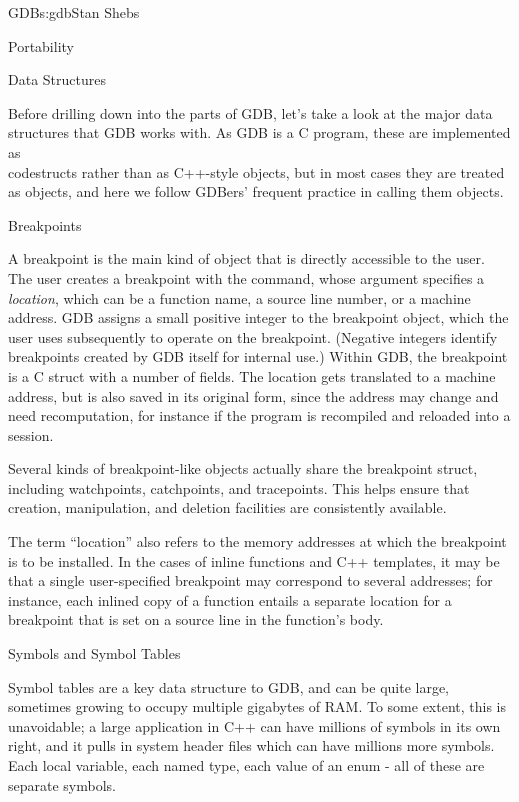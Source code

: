 \begin{aosachapter}{GDB}{s:gdb}{Stan Shebs}
\begin{aosasect1}{Portability}
\end{aosasect1}

\begin{aosasect1}{Data Structures}

Before drilling down into the parts of GDB, let's take a look at the
major data structures that GDB works with.  As GDB is a C program,
these are implemented as \\code{struct}s rather than as C++-style
objects, but in most cases they are treated as objects, and here we
follow GDBers' frequent practice in calling them objects.

\end{aosasect1}

\begin{aosasect2}{Breakpoints}

A breakpoint is the main kind of object that is directly accessible to
the user.  The user creates a breakpoint with the 
command, whose argument specifies a {\em location}, which can be a
function name, a source line number, or a machine address.  GDB
assigns a small positive integer to the breakpoint object, which the
user uses subsequently to operate on the breakpoint.  (Negative
integers identify breakpoints created by GDB itself for internal use.)
Within GDB, the breakpoint is a C struct with a number of fields.  The
location gets translated to a machine address, but is also saved in
its original form, since the address may change and need
recomputation, for instance if the program is recompiled and reloaded
into a session.

Several kinds of breakpoint-like objects actually share the breakpoint
struct, including watchpoints, catchpoints, and tracepoints.  This
helps ensure that creation, manipulation, and deletion facilities are
consistently available.

The term ``location'' also refers to the memory addresses at which the
breakpoint is to be installed.  In the cases of inline functions and
C++ templates, it may be that a single user-specified breakpoint may
correspond to several addresses; for instance, each inlined copy of a
function entails a separate location for a breakpoint that is set on a
source line in the function's body.

\end{aosasect2}

\begin{aosasect2}{Symbols and Symbol Tables}

Symbol tables are a key data structure to GDB, and can be quite large,
sometimes growing to occupy multiple gigabytes of RAM.  To some
extent, this is unavoidable; a large application in C++ can have
millions of symbols in its own right, and it pulls in system header
files which can have millions more symbols.  Each local variable, each
named type, each value of an enum - all of these are separate symbols.


\end{aosasect2}
\end{aosachapter}

